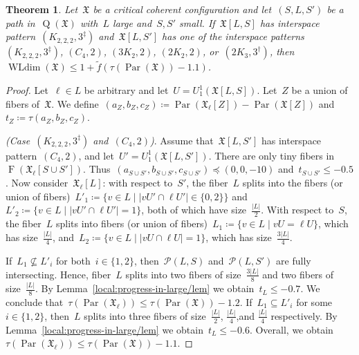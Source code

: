 \documentclass[english,a4paper]{article}
\theoremstyle{plain}
\newtheorem{theorem}             {Theorem}[section]
\theoremstyle{definition}
\newcommand{\abs}[1]{| #1 |}
\DeclareMathOperator{\Fibers}{F}
\newcommand{\coherentConfig}{\ensuremath{\mathfrak{X}}}
\newcommand{\fibers}[1]{\ensuremath{\Fibers \left( #1 \right)}}
\newcommand{\interspace}[2]{\ensuremath{\coherentConfig[#1,#2]}}
\DeclareMathOperator*{\WLdim}{WLdim}
\newcommand{\wldim}[1]{\ensuremath{\WLdim\left(#1\right)}}
\DeclareMathOperator*{\Quotient}{Q}
\newcommand{\quotientGraph}[1]{\ensuremath{\Quotient(#1)}}
\newcommand{\equivalenceClasses}[1]{\ensuremath{\mathcal{P}(#1)}}
\newcommand{\f}{f}
\DeclareMathOperator{\parameters}{Par}
\newcommand{\ipfourMatching}{\ensuremath{(\disjointCliques{2}{2},2)}}
\newcommand{\ipfourCycle}   {\ensuremath{(\cycle{4},2)}}
\newcommand{\ipsixMatching}             {\ensuremath{(\disjointCliques{3}{2},2)}}
\newcommand{\ipsixTriangle}               {\ensuremath{(\disjointCliques{2}{3},3^\dag)}}
\newcommand{\ipsixMatchingComplementD}{\ensuremath{(\clique{2,2,2},3^\ddag)}}
\newcommand{\clique}[1]{\ensuremath{K_{#1}}}
\newcommand{\cycle}[1]{\ensuremath{C_{#1}}}
\newcommand{\disjointCliques}[2]{\ensuremath{#1 \clique{#2}}}
\begin{document}
\begin{theorem}
\label{local:S-L-S/thm}
    Let~$\coherentConfig$ be a critical coherent configuration and let~$(S,L,S')$ be a path in~$\quotientGraph{\coherentConfig}$ with~$L$ large and~$S,S'$ small.
    If~$\interspace{L}{S}$ has interspace pattern~$\ipsixMatchingComplementD$ and~$\interspace{L}{S'}$ has one of the interspace patterns~$\ipsixMatchingComplementD$, $\ipfourCycle$, $\ipsixMatching$, $\ipfourMatching$, or~$\ipsixTriangle$,
    then~$\wldim{\coherentConfig} \leq 1 + \widetilde{\f}( \tau(\parameters(\coherentConfig)) - 1.1)$.
\end{theorem}
\begin{proof}
    Let~$\ell \in L$ be arbitrary and let~$U = U^1_1(\interspace{L}{S})$.
    Let~$Z$ be a union of fibers of~$\coherentConfig$.
    We define~$(a_Z,b_Z,c_Z) \coloneqq \parameters(\coherentConfig_{\ell}[Z]) - \parameters(\coherentConfig[Z])$ and~$t_Z \coloneqq \tau(a_Z,b_Z,c_Z)$.


    \textit{(Case~$\ipsixMatchingComplementD$ and~$\ipfourCycle$)}.
    Assume that~$\interspace{L}{S'}$ has interspace pattern~$\ipfourCycle$, and let~$U' = U^1_1(\interspace{L}{S'})$.
    There are only tiny fibers in~$\fibers{\coherentConfig_\ell[S \cup S']}$.
    Thus~$(a_{S \cup S'},b_{S \cup S'}, c_{S \cup S'}) \preceq (0,0,-10)$ and~$t_{S \cup S'} \leq - 0.5$.
    Now consider~$\coherentConfig_\ell[L]$:
    with respect to~$S'$, the fiber~$L$ splits into the fibers (or union of fibers)~$L'_1 \coloneqq \{v \in L \mid |v U' \cap \ell U'| \in \{0,2\}\}$
    and~$L'_2 \coloneqq \{ v \in L \mid |v U' \cap \ell U'| = 1\}$,
    both of which have size~$\frac{\abs{L}}{2}$.
    With respect to~$S $, the fiber~$L$ splits into fibers (or union of fibers)~$L_1 \coloneqq \{v \in L \mid vU = \ell U\}$, which has size~$\frac{\abs{L}}{4}$, and~$L_2 \coloneqq \{v \in L \mid \abs{vU \cap \ell U} = 1\}$, which has size~$\frac{3\abs{L}}{4}$.

    If~$L_1 \not\subseteq L'_i$ for both~$i \in \{1,2\}$, then~$\equivalenceClasses{L,S}$ and~$\equivalenceClasses{L,S'}$ are fully intersecting.
    Hence, fiber~$L$ splits into two fibers of size~$\frac{3\abs{L}}{8}$ and two fibers of size~$\frac{\abs{L}}{8}$.
    By Lemma~\ref{local:progress-in-large/lem} we obtain~$t_L \leq -0.7$.
    We conclude that~$\tau(\parameters(\coherentConfig_\ell)) \leq \tau(\parameters(\coherentConfig))- 1.2$.
    If~$L_1 \subseteq L'_i$ for some~$i \in \{1,2\}$, then~$L$ splits into three fibers of size~$\frac{\abs{L}}{2}$, $\frac{\abs{L}}{4}$,and  $\frac{\abs{L}}{4}$ respectively.
    By Lemma~\ref{local:progress-in-large/lem} we obtain~$t_L \leq -0.6$.
    Overall, we obtain~$\tau(\parameters(\coherentConfig_\ell)) \leq \tau(\parameters(\coherentConfig))- 1.1$.



\end{proof}
\end{document}
